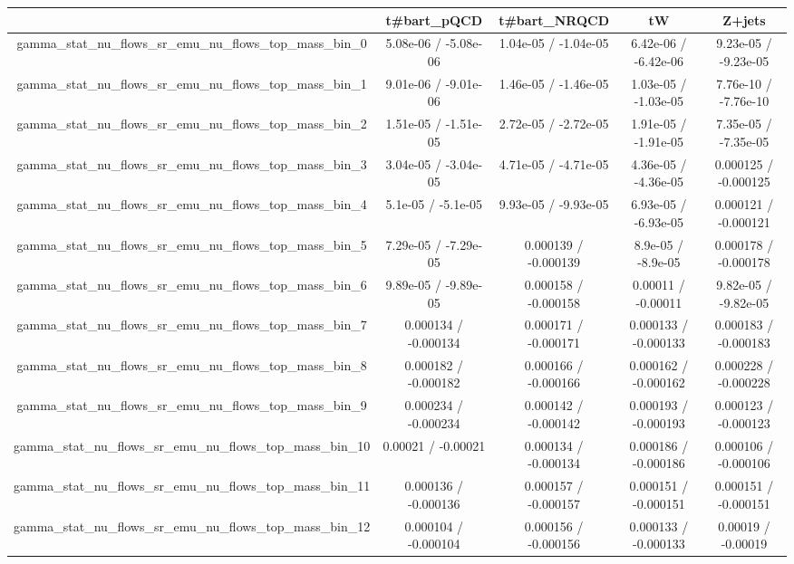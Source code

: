 \documentclass[10pt]{article}
\begin{document}
\begin{table}[htbp]
\begin{center}
\begin{tabular}{|c|c|c|c|c|}
\hline 
      & t#bar{t}_{pQCD}      & t#bar{t}_{NRQCD}      & tW      & Z+jets \\ 
\hline 
  gamma_stat_nu_flows_sr_emu_nu_flows_top_mass_bin_0 & 5.08e-06 / -5.08e-06 & 1.04e-05 / -1.04e-05 & 6.42e-06 / -6.42e-06 & 9.23e-05 / -9.23e-05 \\ 
  gamma_stat_nu_flows_sr_emu_nu_flows_top_mass_bin_1 & 9.01e-06 / -9.01e-06 & 1.46e-05 / -1.46e-05 & 1.03e-05 / -1.03e-05 & 7.76e-10 / -7.76e-10 \\ 
  gamma_stat_nu_flows_sr_emu_nu_flows_top_mass_bin_2 & 1.51e-05 / -1.51e-05 & 2.72e-05 / -2.72e-05 & 1.91e-05 / -1.91e-05 & 7.35e-05 / -7.35e-05 \\ 
  gamma_stat_nu_flows_sr_emu_nu_flows_top_mass_bin_3 & 3.04e-05 / -3.04e-05 & 4.71e-05 / -4.71e-05 & 4.36e-05 / -4.36e-05 & 0.000125 / -0.000125 \\ 
  gamma_stat_nu_flows_sr_emu_nu_flows_top_mass_bin_4 & 5.1e-05 / -5.1e-05 & 9.93e-05 / -9.93e-05 & 6.93e-05 / -6.93e-05 & 0.000121 / -0.000121 \\ 
  gamma_stat_nu_flows_sr_emu_nu_flows_top_mass_bin_5 & 7.29e-05 / -7.29e-05 & 0.000139 / -0.000139 & 8.9e-05 / -8.9e-05 & 0.000178 / -0.000178 \\ 
  gamma_stat_nu_flows_sr_emu_nu_flows_top_mass_bin_6 & 9.89e-05 / -9.89e-05 & 0.000158 / -0.000158 & 0.00011 / -0.00011 & 9.82e-05 / -9.82e-05 \\ 
  gamma_stat_nu_flows_sr_emu_nu_flows_top_mass_bin_7 & 0.000134 / -0.000134 & 0.000171 / -0.000171 & 0.000133 / -0.000133 & 0.000183 / -0.000183 \\ 
  gamma_stat_nu_flows_sr_emu_nu_flows_top_mass_bin_8 & 0.000182 / -0.000182 & 0.000166 / -0.000166 & 0.000162 / -0.000162 & 0.000228 / -0.000228 \\ 
  gamma_stat_nu_flows_sr_emu_nu_flows_top_mass_bin_9 & 0.000234 / -0.000234 & 0.000142 / -0.000142 & 0.000193 / -0.000193 & 0.000123 / -0.000123 \\ 
  gamma_stat_nu_flows_sr_emu_nu_flows_top_mass_bin_10 & 0.00021 / -0.00021 & 0.000134 / -0.000134 & 0.000186 / -0.000186 & 0.000106 / -0.000106 \\ 
  gamma_stat_nu_flows_sr_emu_nu_flows_top_mass_bin_11 & 0.000136 / -0.000136 & 0.000157 / -0.000157 & 0.000151 / -0.000151 & 0.000151 / -0.000151 \\ 
  gamma_stat_nu_flows_sr_emu_nu_flows_top_mass_bin_12 & 0.000104 / -0.000104 & 0.000156 / -0.000156 & 0.000133 / -0.000133 & 0.00019 / -0.00019 \\ 

\end{tabular}
\end{center}
\end{table}
\end{document}
